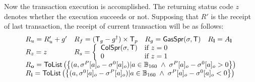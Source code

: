 Now the transaction execution is accomplished.
The returning status code $z$ denotes whether the execution succeeds or not. 
Supposing that $R'$ is the receipt of last transaction, 
the receipt of current transaction will be as follows:
\begin{align}
	\begin{array}{llll}
		R_u=R'_u+g' & R_f = (\tx_g-g^{\dagger})\times \tx_p & R_g = \mathsf{GasSpr}(\st,\tx) & R_{\bf l}=A_{\bf l} \\ 
		R_z=z & \multicolumn{3}{l}{R_s = \left\{\begin{array}{ll}
			\mathsf{ColSpr}(\st,\tx) & \text{if }z=0\\
			0 & \text{if }z=1
		\end{array}\right.} \\
		\multicolumn{4}{l}{R_{\bf o}=\mathsf{ToList}\left(\left\{ (a,\st^P[a]_o - \st^0[a]_o) | a\in \B_{160}\;\wedge\; \st^P[a]_o - \st^0[a]_o>0 \right\}\right)}\\
		\multicolumn{4}{l}{R_{\bf i}=\mathsf{ToList}\left(\left\{(a,\st^0[a]_o - \st^P[a]_o) | a\in \B_{160}\;\wedge\; \st^P[a]_o - \st^0[a]_o<0  \right\}\right)}
	\end{array}
\end{align}
